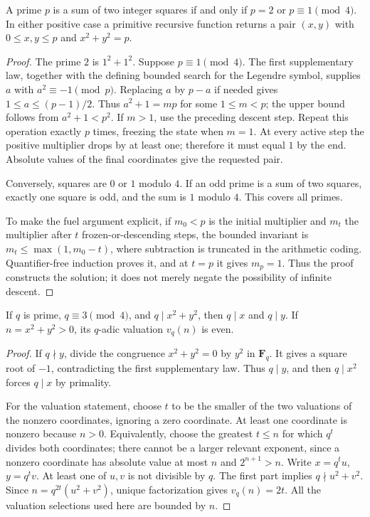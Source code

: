 \begin{theorem}\label{qr:two-prime}
A prime $p$ is a sum of two integer squares if and only if $p=2$ or
$p\equiv1\pmod4$. In either positive case a primitive recursive
function returns a pair $(x,y)$ with $0\le x,y\le p$ and
$x^2+y^2=p$.
\end{theorem}
\begin{proof}
The prime $2$ is $1^2+1^2$. Suppose $p\equiv1\pmod4$.
The first supplementary law, together with the defining bounded search
for the Legendre symbol, supplies $a$ with $a^2\equiv-1\pmod p$.
Replacing $a$ by $p-a$ if needed gives $1\le a\le(p-1)/2$.
Thus $a^2+1=mp$ for some $1\le m<p$; the upper bound follows
from $a^2+1<p^2$. If $m>1$, use the preceding descent step.
Repeat this operation exactly $p$ times, freezing the state when $m=1$.
At every active step the positive multiplier drops by at least one;
therefore it must equal $1$ by the end. Absolute values of the final
coordinates give the requested pair.

Conversely, squares are $0$ or $1$ modulo $4$. If an odd prime is
a sum of two squares, exactly one square is odd, and the sum is
$1$ modulo $4$. This covers all primes.

To make the fuel argument explicit, if $m_0<p$ is the initial
multiplier and $m_t$ the multiplier after $t$ frozen-or-descending
steps, the bounded invariant is
$m_t\le\max(1,m_0-t)$, where subtraction is truncated in the
arithmetic coding. Quantifier-free induction proves it, and at $t=p$
it gives $m_p=1$. Thus the proof constructs the solution; it does not
merely negate the possibility of infinite descent.
\end{proof}

\begin{lemma}\label{qr:two-obstruction}
If $q$ is prime, $q\equiv3\pmod4$, and $q\mid x^2+y^2$, then
$q\mid x$ and $q\mid y$. If $n=x^2+y^2>0$, its $q$-adic
valuation $v_q(n)$ is even.
\end{lemma}
\begin{proof}
If $q\nmid y$, divide the congruence $x^2+y^2=0$ by $y^2$
in $\mathbf F_q$. It gives a square root of $-1$, contradicting the
first supplementary law. Thus $q\mid y$, and then $q\mid x^2$
forces $q\mid x$ by primality.

For the valuation statement, choose $t$ to be the smaller of the two
valuations of the nonzero coordinates, ignoring a zero coordinate.
At least one coordinate is nonzero because $n>0$. Equivalently, choose
the greatest $t\le n$ for which $q^t$ divides both coordinates;
there cannot be a larger relevant exponent, since a nonzero coordinate
has absolute value at most $n$ and $2^{n+1}>n$. Write
$x=q^t u$, $y=q^t v$. At least one of $u,v$ is not divisible by $q$.
The first part implies $q\nmid u^2+v^2$. Since
$n=q^{2t}(u^2+v^2)$, unique factorization gives $v_q(n)=2t$.
All the valuation selections used here are bounded by $n$.
\end{proof}

